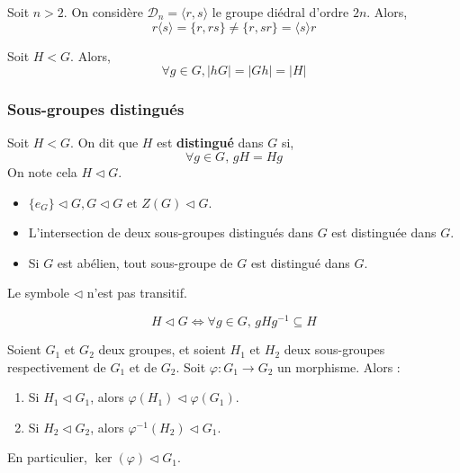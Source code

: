   \begin{example}
    Soit $n > 2$. On considère $\mathcal{D}_n = \langle r, s \rangle$ le groupe diédral d'ordre $2n$. Alors,
    \[ r \langle s \rangle = \{ r, rs \} \neq \{ r, sr \} = \langle s \rangle r \]
  \end{example}

  \begin{proposition}
    Soit $H < G$. Alors,
    \[ \forall g \in G, \vert hG \vert = \vert Gh \vert = \vert H \vert \]
  \end{proposition}

  \subsubsection{Sous-groupes distingués}


  \begin{definition}
    Soit $H < G$. On dit que $H$ est \textbf{distingué} dans $G$ si,
    \[ \forall g \in G, \, gH = Hg \]
    On note cela $H \lhd G$.
  \end{definition}

  \begin{example}
    \begin{itemize}
      \item $\{ e_G \} \lhd G, G \lhd G \text{ et } Z(G) \lhd G$.
      \item L'intersection de deux sous-groupes distingués dans $G$ est distinguée dans $G$.
      \item Si $G$ est abélien, tout sous-groupe de $G$ est distingué dans $G$.
    \end{itemize}
  \end{example}


  \begin{remark}
    Le symbole $\lhd$ n'est pas transitif.
  \end{remark}

  \begin{proposition}
    \[ H \lhd G \iff \forall g \in G, \, gHg^{-1} \subseteq H \]
  \end{proposition}


  \begin{proposition}
    Soient $G_1$ et $G_2$ deux groupes, et soient $H_1$ et $H_2$ deux sous-groupes respectivement de $G_1$ et de $G_2$. Soit $\varphi : G_1 \rightarrow G_2$ un morphisme. Alors :
    \begin{enumerate}[label={\bfseries(\roman*)}]
      \item Si $H_1 \lhd G_1$, alors $\varphi(H_1) \lhd \varphi(G_1)$.
      \item Si $H_2 \lhd G_2$, alors $\varphi^{-1}(H_2) \lhd G_1$.
    \end{enumerate}
    En particulier, $\ker(\varphi) \lhd G_1$.
  \end{proposition}

